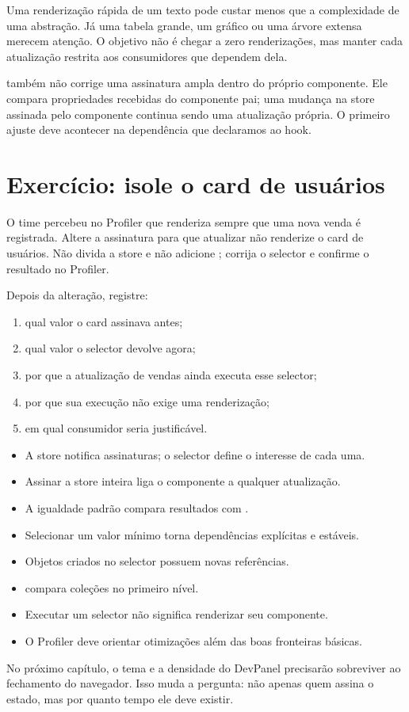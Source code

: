 Uma renderização rápida de um texto pode custar menos que a complexidade de uma
abstração. Já uma tabela grande, um gráfico ou uma árvore extensa merecem
atenção. O objetivo não é chegar a zero renderizações, mas manter cada atualização
restrita aos consumidores que dependem dela.

 também não corrige uma assinatura ampla dentro do próprio
componente. Ele compara propriedades recebidas do componente pai; uma mudança
na store assinada pelo componente continua sendo uma atualização própria. O
primeiro ajuste deve acontecer na dependência que declaramos ao hook.

\section{Exercício: isole o card de usuários}

\begin{tarefa}
O time percebeu no Profiler que  renderiza sempre que uma
nova venda é registrada. Altere a assinatura para que atualizar
 não renderize o card de usuários. Não divida a store e não
adicione ; corrija o selector e confirme o resultado no
Profiler.
\end{tarefa}

Depois da alteração, registre:

\begin{enumerate}
  \item qual valor o card assinava antes;
  \item qual valor o selector devolve agora;
  \item por que a atualização de vendas ainda executa esse selector;
  \item por que sua execução não exige uma renderização;
  \item em qual consumidor  seria justificável.
\end{enumerate}


\begin{resumo}
\begin{itemize}
  \item A store notifica assinaturas; o selector define o interesse de cada uma.
  \item Assinar a store inteira liga o componente a qualquer atualização.
  \item A igualdade padrão compara resultados com .
  \item Selecionar um valor mínimo torna dependências explícitas e estáveis.
  \item Objetos criados no selector possuem novas referências.
  \item {} compara coleções no primeiro nível.
  \item Executar um selector não significa renderizar seu componente.
  \item O Profiler deve orientar otimizações além das boas fronteiras básicas.
\end{itemize}
\end{resumo}

No próximo capítulo, o tema e a densidade do DevPanel precisarão sobreviver ao
fechamento do navegador. Isso muda a pergunta: não apenas quem assina o estado,
mas por quanto tempo ele deve existir.
